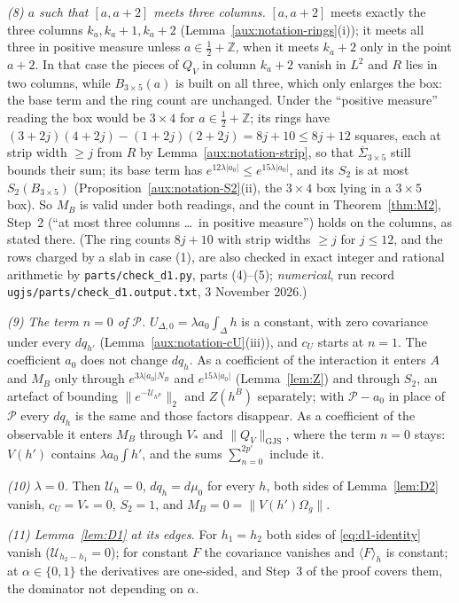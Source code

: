 \documentclass[11pt,a4paper]{article}
\theoremstyle{plain}
\theoremstyle{definition}
\theoremstyle{plain}
\theoremstyle{definition}
\newcommand{\Z}{\mathbb{Z}}
\newcommand{\Om}{\Omega}
\newcommand{\GJS}[1]{\lVert #1\rVert_{\mathrm{GJS}}}   %
\newcommand{\ev}[2]{\langle #1\rangle_{#2}}            %
\newcommand{\Uc}{\mathcal U}
\newcommand{\dmu}{d\mu_0}
\begin{document}
\emph{(8) $a$ such that $[a,a+2]$ meets three columns.} $[a,a+2]$ meets exactly the three
columns $k_a,k_a+1,k_a+2$ (Lemma~\ref{aux:notation-rings}(i)); it meets all three in positive
measure unless $a\in\frac12+\Z$, when it meets $k_a+2$ only in the point $a+2$. In that case
the pieces of $Q_V$ in column $k_a+2$ vanish in $L^2$ and $R$ lies in two columns, while
$B_{3\times5}(a)$ is built on all three, which only enlarges the box: the base term and the ring
count are unchanged. Under the ``positive measure'' reading the box would be $3\times4$ for
$a\in\frac12+\Z$; its rings have $(3+2j)(4+2j)-(1+2j)(2+2j)=8j+10\le8j+12$ squares, each at
strip width $\ge j$ from $R$ by Lemma~\ref{aux:notation-strip}, so that
$\overline\Sigma_{3\times5}$ still bounds their sum; its base
term has $e^{12\lambda|a_0|}\le e^{15\lambda|a_0|}$, and its $S_2$ is at most $S_2(B_{3\times5})$
(Proposition~\ref{aux:notation-S2}(ii), the $3\times4$ box lying in a $3\times5$ box). So $M_B$
is valid under both readings, and the count in Theorem~\ref{thm:M2}, Step~2 (``at most three
columns \dots\ in positive measure'') holds on the columns, as stated there.  (The
ring counts $8j+10$ with strip widths $\ge j$ for $j\le12$, and the rows charged by a slab in case
(1), are also checked in exact integer and rational arithmetic by \texttt{parts/check\_d1.py},
parts (4)--(5); \emph{numerical}, run record \texttt{ugjs/parts/}\allowbreak\texttt{check\_d1.output.txt}, 3 November 2026.)

\emph{(9) The term $n=0$ of $\mathscr P$.} $U_{\Delta,0}=\lambda a_0\int_\Delta h$ is a
constant, with zero covariance under every $dq_{h'}$ (Lemma~\ref{aux:notation-cU}(iii)), and
$c_U$ starts at $n=1$. The coefficient $a_0$ does not change $dq_h$. As a coefficient of the
interaction it enters $A$ and $M_B$ only through $e^{3\lambda|a_0|N_B}$ and $e^{15\lambda|a_0|}$
(Lemma~\ref{lem:Z}) and through $S_2$, an artefact of bounding
$\|e^{-\Uc_{h^B}}\|_2$ and $Z(h^B)$ separately; with $\mathscr P-a_0$ in place of $\mathscr P$
every $dq_h$ is the same and those factors disappear. As a coefficient of the observable it
enters $M_B$ through $V_*$ and $\GJS{Q_V}$, where the term $n=0$ stays: $V(h')$ contains
$\lambda a_0\int h'$, and the sums $\sum_{n=0}^{2p'}$ include it.

\emph{(10) $\lambda=0$.} Then $\Uc_h=0$, $dq_h=\dmu$ for every $h$, both sides of
Lemma~\ref{lem:D2} vanish, $c_U=V_*=0$, $S_2=1$, and $M_B=0=\|V(h')\Om_g\|$.

\emph{(11) Lemma~\ref{lem:D1} at its edges.} For $h_1=h_2$ both sides of
\eqref{eq:d1-identity} vanish ($\Uc_{h_2-h_1}=0$); for constant $F$ the covariance vanishes and
$\ev{F}{h}$ is constant; at $\alpha\in\{0,1\}$ the derivatives are one-sided, and Step~3 of the
proof covers them, the dominator not depending on $\alpha$.
\end{document}
